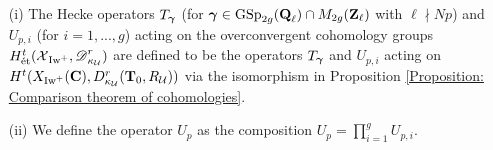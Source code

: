 \begin{Definition}\label{Definition: Hecke operators on overconvergent cohomology}
\begin{enumerate}
    \item[(i)] The Hecke operators $T_{\operatorname{\boldsymbol{\gamma}}}$ (for $\operatorname{\boldsymbol{\gamma}}\in \operatorname{GSp}_{2g}(\operatorname{\mathbf{Q}}_{\ell})\cap M_{2g}(\operatorname{\mathbf{Z}}_{\ell})$ with $\ell\nmid Np$) and $U_{p,i}$ (for $i=1, ..., g$) acting on the overconvergent cohomology groups $H_{\operatorname{\textrm{\'{e}t}}}^t(\operatorname{\mathcal{X}}_{\operatorname{Iw}^+}, \operatorname{\mathscr{D}}_{\kappa_{\operatorname{\mathcal{U}}}}^r)$ are defined to be the operators $T_{\operatorname{\boldsymbol{\gamma}}}$ and $U_{p,i}$ acting on $H^t(X_{\operatorname{Iw}^+}(\operatorname{\mathbf{C}}), D_{\kappa_{\operatorname{\mathcal{U}}}}^r(\operatorname{\mathbf{T}}_0, R_{\operatorname{\mathcal{U}}}))$ via the isomorphism in Proposition \ref{Proposition: Comparison theorem of cohomologies}.
    \item[(ii)] We define the operator $U_{p}$ as the composition $U_p = \prod_{i=1}^gU_{p,i}$.
\end{enumerate}
\end{Definition}